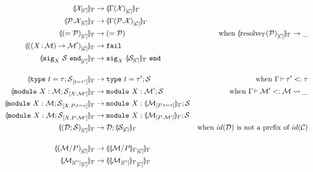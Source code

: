 \begin{align*}
  \Oenrich{\E}{\iC}{\iX}
  &\to \Oenrich{\E}{\iC}{\lookup{\E}{\iX}}\\
  \Oenrich{\E}{\iC}{\iP.\iX}
  &\to \Oenrich{\E}{\iC}{\lookup{\E}{\iP.\iX}}\\
  \Oenrich{\E}{\iC}{\Salias{\iP}}
  &\to \Salias{\iP} &\text{when } \Oenrich{\E}{\iC}{\resolve{\E}{\iP}}\to \_\\
  \Oenrich{\E}{\iC}{(\Sfunctor{\ix}{\iM}{\iM'})}
  &\to \texttt{fail}\\
  \Oenrich{\E}{\iC}{\Ssig{\ix}{\iS}}
  &\to \Ssig{\ix}{\Oenrich{\E}{\iC}{\iS}}\\[4mm]
  \Oenrich{\E}{t = \tau'}{\Stype{t}{\tau};\iS}
  &\to \Stype{t}{\tau'};\iS
  &\text{when } \subtyp{\E}{\tau'}{\tau}\\
  \Oenrich{\E}{\ix : \iM'}{\Smodulety{\ix}{\iM};\iS}
  &\to \Smodulety{\ix}{\iM'};\iS
  &\text{when } \submod{\E}{\iM'}{\iM}{\_}\\
  \Oenrich{\E}{\ix.\ip.t = \tau}{\Smodulety{\ix}{\iM};\iS}
  &\to \Smodulety{\ix}{\Oenrich{\E}{\ip.t = \tau}{\iM}};\iS\\
  \Oenrich{\E}{\ix.\ip : \iM'}{\Smodulety{\ix}{\iM};\iS}
  &\to \Smodulety{\ix}{\Oenrich{\E}{\ip : \iM'}{\iM}};\iS\\
  \Oenrich{\E}{\iC}{(\iD;\iS)}
  &\to \iD;\Oenrich{\E}{\iC}{\iS}
  &\text{when } id(\iD) \text{ is not a prefix of } id(\iC)\\[4mm]
  \Oenrich{\E}{\iC}{(\Sstrengthen{l}{\ip}{\iM})}
  &\to \Oenrich{\E}{\iC}{\Ostrengthen{\E}{l}{\ip}{\iM}}\\
  \Oenrich{\E}{\iC}{\Senrich{\iC'}{\iM}}
  &\to \Oenrich{\E}{\iC}{\Oenrich{\E}{\iC'}{\iM}}\\
\end{align*}\vspace{-3mm}


